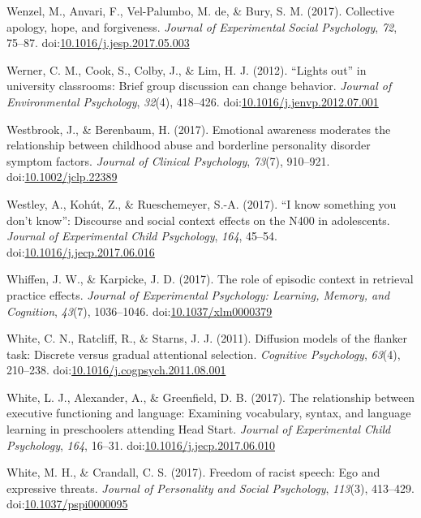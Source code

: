 \documentclass[english,man]{apa6}
\theoremstyle{definition}
\theoremstyle{definition}
\theoremstyle{definition}
\theoremstyle{remark}
\begin{document}
\hypertarget{ref-Wenzel2017}{}
Wenzel, M., Anvari, F., Vel-Palumbo, M. de, \& Bury, S. M. (2017).
Collective apology, hope, and forgiveness. \emph{Journal of Experimental
Social Psychology}, \emph{72}, 75--87.
doi:\href{https://doi.org/10.1016/j.jesp.2017.05.003}{10.1016/j.jesp.2017.05.003}

\hypertarget{ref-Werner2012}{}
Werner, C. M., Cook, S., Colby, J., \& Lim, H. J. (2012). ``Lights out''
in university classrooms: Brief group discussion can change behavior.
\emph{Journal of Environmental Psychology}, \emph{32}(4), 418--426.
doi:\href{https://doi.org/10.1016/j.jenvp.2012.07.001}{10.1016/j.jenvp.2012.07.001}

\hypertarget{ref-Westbrook2017}{}
Westbrook, J., \& Berenbaum, H. (2017). Emotional awareness moderates
the relationship between childhood abuse and borderline personality
disorder symptom factors. \emph{Journal of Clinical Psychology},
\emph{73}(7), 910--921.
doi:\href{https://doi.org/10.1002/jclp.22389}{10.1002/jclp.22389}

\hypertarget{ref-Westley2017}{}
Westley, A., Kohút, Z., \& Rueschemeyer, S.-A. (2017). ``I know
something you don't know'': Discourse and social context effects on the
N400 in adolescents. \emph{Journal of Experimental Child Psychology},
\emph{164}, 45--54.
doi:\href{https://doi.org/10.1016/j.jecp.2017.06.016}{10.1016/j.jecp.2017.06.016}

\hypertarget{ref-Whiffen2017}{}
Whiffen, J. W., \& Karpicke, J. D. (2017). The role of episodic context
in retrieval practice effects. \emph{Journal of Experimental Psychology:
Learning, Memory, and Cognition}, \emph{43}(7), 1036--1046.
doi:\href{https://doi.org/10.1037/xlm0000379}{10.1037/xlm0000379}

\hypertarget{ref-White2011}{}
White, C. N., Ratcliff, R., \& Starns, J. J. (2011). Diffusion models of
the flanker task: Discrete versus gradual attentional selection.
\emph{Cognitive Psychology}, \emph{63}(4), 210--238.
doi:\href{https://doi.org/10.1016/j.cogpsych.2011.08.001}{10.1016/j.cogpsych.2011.08.001}

\hypertarget{ref-White2017}{}
White, L. J., Alexander, A., \& Greenfield, D. B. (2017). The
relationship between executive functioning and language: Examining
vocabulary, syntax, and language learning in preschoolers attending Head
Start. \emph{Journal of Experimental Child Psychology}, \emph{164},
16--31.
doi:\href{https://doi.org/10.1016/j.jecp.2017.06.010}{10.1016/j.jecp.2017.06.010}

\hypertarget{ref-White2017a}{}
White, M. H., \& Crandall, C. S. (2017). Freedom of racist speech: Ego
and expressive threats. \emph{Journal of Personality and Social
Psychology}, \emph{113}(3), 413--429.
doi:\href{https://doi.org/10.1037/pspi0000095}{10.1037/pspi0000095}
\end{document}
